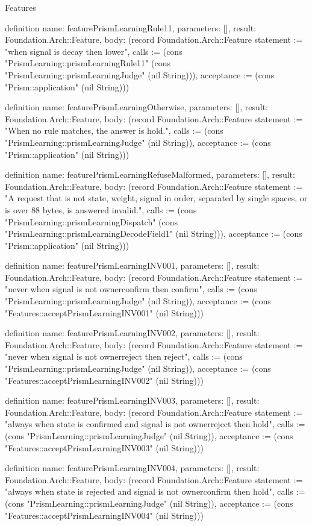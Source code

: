 \begin{lexlean}{Features}
\begin{semanticmodule}
definition{
  name: featurePrismLearningRule11,
  parameters: [],
  result: Foundation.Arch::Feature,
  body: (record Foundation.Arch::Feature {statement := "when signal is decay then lower", calls := (cons "PrismLearning::prismLearningRule11" (cons "PrismLearning::prismLearningJudge" (nil String))), acceptance := (cons "Prism::application" (nil String))})
}

definition{
  name: featurePrismLearningOtherwise,
  parameters: [],
  result: Foundation.Arch::Feature,
  body: (record Foundation.Arch::Feature {statement := "When no rule matches, the answer is hold.", calls := (cons "PrismLearning::prismLearningJudge" (nil String)), acceptance := (cons "Prism::application" (nil String))})
}

definition{
  name: featurePrismLearningRefuseMalformed,
  parameters: [],
  result: Foundation.Arch::Feature,
  body: (record Foundation.Arch::Feature {statement := "A request that is not state, weight, signal in order, separated by single spaces, or is over 88 bytes, is answered invalid.", calls := (cons "PrismLearning::prismLearningDispatch" (cons "PrismLearning::prismLearningDecodeField1" (nil String))), acceptance := (cons "Prism::application" (nil String))})
}

definition{
  name: featurePrismLearningINV001,
  parameters: [],
  result: Foundation.Arch::Feature,
  body: (record Foundation.Arch::Feature {statement := "never when signal is not ownerconfirm then confirm", calls := (cons "PrismLearning::prismLearningJudge" (nil String)), acceptance := (cons "Features::acceptPrismLearningINV001" (nil String))})
}

definition{
  name: featurePrismLearningINV002,
  parameters: [],
  result: Foundation.Arch::Feature,
  body: (record Foundation.Arch::Feature {statement := "never when signal is not ownerreject then reject", calls := (cons "PrismLearning::prismLearningJudge" (nil String)), acceptance := (cons "Features::acceptPrismLearningINV002" (nil String))})
}

definition{
  name: featurePrismLearningINV003,
  parameters: [],
  result: Foundation.Arch::Feature,
  body: (record Foundation.Arch::Feature {statement := "always when state is confirmed and signal is not ownerreject then hold", calls := (cons "PrismLearning::prismLearningJudge" (nil String)), acceptance := (cons "Features::acceptPrismLearningINV003" (nil String))})
}

definition{
  name: featurePrismLearningINV004,
  parameters: [],
  result: Foundation.Arch::Feature,
  body: (record Foundation.Arch::Feature {statement := "always when state is rejected and signal is not ownerconfirm then hold", calls := (cons "PrismLearning::prismLearningJudge" (nil String)), acceptance := (cons "Features::acceptPrismLearningINV004" (nil String))})
}


\end{semanticmodule}
\end{lexlean}
